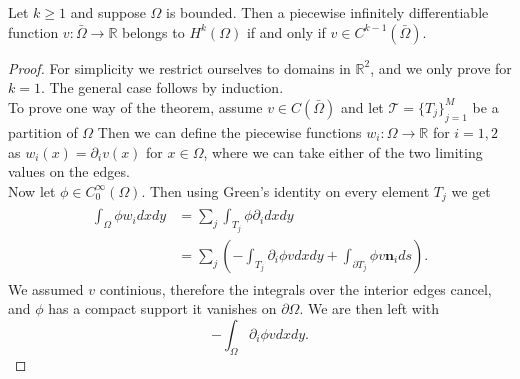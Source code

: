 
\begin{thmx}
    Let $k\geq1$ and suppose $\Omega$ is bounded. Then a piecewise infinitely differentiable function $v:\bar{\Omega}\rightarrow \mathbb{R}$
    belongs to $H^k(\Omega)$ if and only if $v\in C^{k-1}(\bar{\Omega})$.
\end{thmx}

\begin{proof}
    For simplicity we restrict ourselves to domains in $\mathbb{R}^2$, and we only prove for $k=1$. The general case follows by induction.\\ %

    To prove one way of the theorem, assume $v\in C(\bar\Omega)$ and let $\mathcal{T}={\{T_j\}}^M_{j=1}$ be a partition of $\Omega$
    Then we can define the piecewise functions $w_i:\Omega\rightarrow \mathbb{R}$ for $i=1,2$ as $w_i(x)=\partial_i v(x)$ for $x\in\Omega$, where we can take either of the two limiting values on the edges. %
    \\
    Now let $\phi\in C^{\infty}_0 (\Omega)$. Then using Green's identity on every element $T_j$ we get
    \begin{align}
    \begin{split}
        \int_\Omega \phi w_i dxdy &= \sum_j\int_{T_j} \phi \partial_i dx dy \\
        &= \sum_j \left( -\int_{T_j} \partial_i \phi v dxdy + \int_{\partial T_j} \phi v \mathbf{n}_i ds\right).
    \end{split}
    \end{align}
    We assumed $v$ continious, therefore the integrals over the interior edges cancel, and $\phi$ has a compact support it vanishes on $\partial \Omega$. We are then left with
    \begin{equation}
        -\int_\Omega \partial_i \phi v dxdy.
    \end{equation}
\end{proof}